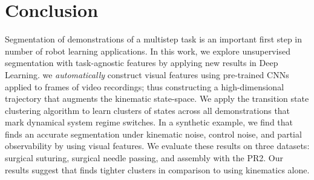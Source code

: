 \documentclass[0-main.tex]{subfiles}
\begin{document}
\section{Conclusion}
Segmentation of demonstrations of a multistep task is an important first step in number of robot learning applications.
In this work, we explore unsupervised segmentation with task-agnostic features by applying new results in Deep Learning.
we \emph{automatically} construct visual features using pre-trained CNNs applied to frames of video recordings; thus constructing a high-dimensional trajectory that augments the kinematic state-space.
We apply the transition state clustering algorithm to learn clusters of states across all demonstrations that mark dynamical system regime switches.
In a synthetic example, we find that \tsc finds an accurate segmentation under kinematic noise, control noise, and partial observability by using visual features. 
We evaluate these results on three datasets: surgical suturing, surgical needle passing, and assembly with the PR2.
Our results suggest that \tsc finds  tighter clusters in comparison to using kinematics alone.
\end{document}
